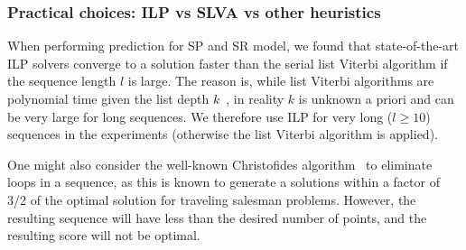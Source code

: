 \subsubsection{Practical choices: ILP vs SLVA vs other heuristics}
When performing prediction for SP and SR model, we found that state-of-the-art ILP solvers converge to a solution faster
than the serial list Viterbi algorithm if the sequence length $l$ is large.
The reason is, while list Viterbi algorithms are polynomial time given the list depth $k$~\cite{nilsson2001sequentially},
in reality $k$ is unknown a priori and can be very large for long sequences.
We therefore use ILP for very long ($l\ge10$) sequences in the experiments (otherwise the list Viterbi algorithm is applied).

One might also consider the well-known Christofides algorithm~\cite{christofides1976} to eliminate loops in a sequence, as this is known to generate a solutions within a factor of 3/2 of the optimal solution for traveling salesman problems. However, the resulting sequence will have less than the desired number of points, and the resulting score will not be optimal.






